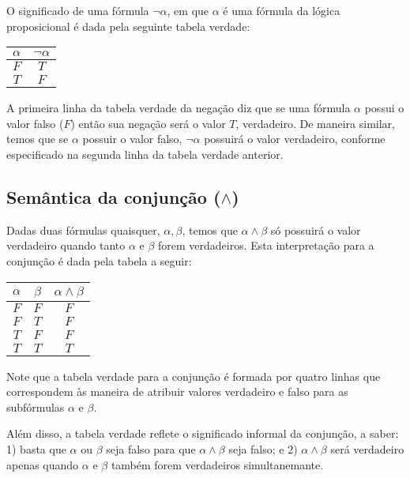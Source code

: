O significado de uma f\'ormula $\neg \alpha$, em que $\alpha$ \'e uma
f\'ormula da l\'ogica proposicional \'e dada pela seguinte tabela
verdade:
\begin{table}[h]
  \begin{tabular}{|c|c|}
    \hline
    $\alpha$ & $\neg \alpha$ \\ \hline
    $F$         & $T$ \\ \hline
    $T$         & $F$ \\ \hline 
  \end{tabular}
  \centering
\end{table}
A primeira linha da tabela verdade da nega\c{c}\~ao diz que se uma
f\'ormula $\alpha$ possui o valor falso ($F$) ent\~ao sua
nega\c{c}\~ao ser\'a o valor $T$, verdadeiro. De maneira similar,
temos que se $\alpha$ possuir o valor falso, $\neg \alpha$ possuir\'a
o valor verdadeiro, conforme especificado na segunda linha da tabela
verdade anterior.

\subsection{Sem\^antica da conjun\c{c}\~ao ($\land$)}

Dadas duas f\'ormulas quaisquer, $\alpha,\beta$, temos que
$\alpha\land\beta$ s\'o possuir\'a o valor verdadeiro quando tanto
$\alpha$ e $\beta$ forem verdadeiros. Esta interpreta\c{c}\~ao para a
conjun\c{c}\~ao \'e dada pela tabela a seguir:
\begin{table}[h]
  \begin{tabular}{|c|c|c|}
    \hline
    $\alpha$ & $\beta$ & $\alpha \land \beta$\\ \hline
    $F$         & $F$        & $F$ \\ \hline
    $F$         & $T$        & $F$ \\ \hline
    $T$         & $F$        & $F$ \\ \hline
    $T$         & $T$        & $T$ \\ \hline
   \end{tabular}
  \centering
\end{table}
Note que a tabela verdade para a conjun\c{c}\~ao \'e formada por
quatro linhas que correspondem \`as maneira de atribuir valores
verdadeiro e falso para as subf\'ormulas $\alpha$ e $\beta$.

Al\'em disso, a tabela verdade reflete o significado informal da
conjun\c{c}\~ao, a saber: 1) basta que $\alpha$ ou $\beta$ seja falso
para que $\alpha\land\beta$ seja falso; e 2) $\alpha\land\beta$ ser\'a
verdadeiro apenas quando $\alpha$ e $\beta$ tamb\'em forem verdadeiros
simultanemante.


